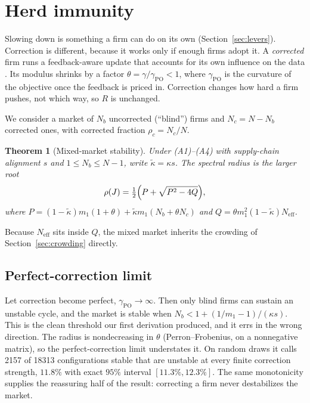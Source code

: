 \documentclass[conference]{IEEEtran}
\theoremstyle{plain}
\newtheorem{theorem}{Theorem}
\newcommand{\Neff}{N_{\mathrm{eff}}}
\begin{document}
\section{Herd immunity}
\label{sec:herd}

Slowing down is something a firm can do on its own (Section~\ref{sec:levers}). Correction is different, because it works only if enough firms adopt it. A \emph{corrected} firm runs a feedback-aware update that accounts for its own influence on the data \cite{izzo2021,miller2021}. Its modulus shrinks by a factor $\theta=\gamma/\gamma_{\mathrm{PO}}<1$, where $\gamma_{\mathrm{PO}}$ is the curvature of the objective once the feedback is priced in. Correction changes how hard a firm pushes, not which way, so $R$ is unchanged.

We consider a market of $N_b$ uncorrected (``blind'') firms and $N_c=N-N_b$ corrected ones, with corrected fraction $\rho_c=N_c/N$.

\begin{theorem}[Mixed-market stability]
\label{thm:mixed}
Under (A1)--(A4) with supply-chain alignment $s$ and $1\le N_b\le N-1$, write $\tilde\kappa=\kappa s$. The spectral radius is the larger root
\begin{equation}
\rho(J)=\tfrac12\Bigl(P+\sqrt{P^2-4Q}\Bigr),
\end{equation}
where $P=(1-\tilde\kappa)m_1(1+\theta)+\tilde\kappa m_1(N_b+\theta N_c)$ and $Q=\theta m_1^2(1-\tilde\kappa)\Neff$.
\end{theorem}

Because $\Neff$ sits inside $Q$, the mixed market inherits the crowding of Section~\ref{sec:crowding} directly.

\subsection{Perfect-correction limit}
Let correction become perfect, $\gamma_{\mathrm{PO}}\to\infty$. Then only blind firms can sustain an unstable cycle, and the market is stable when $N_b<1+(1/m_1-1)/(\kappa s)$. This is the clean threshold our first derivation produced, and it errs in the wrong direction. The radius is nondecreasing in $\theta$ (Perron--Frobenius, on a nonnegative matrix), so the perfect-correction limit understates it. On random draws it calls 2157 of 18313 configurations stable that are unstable at every finite correction strength, $11.8\%$ with exact $95\%$ interval $[11.3\%,12.3\%]$. The same monotonicity supplies the reassuring half of the result: correcting a firm never destabilizes the market.
\end{document}

